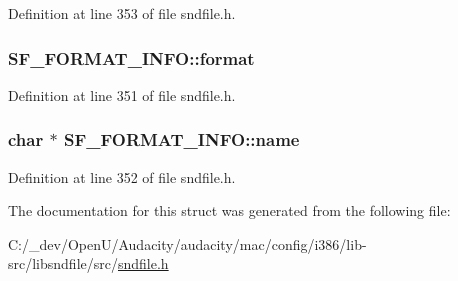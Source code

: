 Definition at line 353 of file sndfile.\+h.

\subsubsection[{\texorpdfstring{format}{format}}]{ S\+F\+\_\+\+F\+O\+R\+M\+A\+T\+\_\+\+I\+N\+F\+O\+::format}\hypertarget{struct_s_f___f_o_r_m_a_t___i_n_f_o_a8d07503c07b5330c298341ca03859f66}{}\label{struct_s_f___f_o_r_m_a_t___i_n_f_o_a8d07503c07b5330c298341ca03859f66}


Definition at line 351 of file sndfile.\+h.

\subsubsection[{\texorpdfstring{name}{name}}]{ char $\ast$ S\+F\+\_\+\+F\+O\+R\+M\+A\+T\+\_\+\+I\+N\+F\+O\+::name}\hypertarget{struct_s_f___f_o_r_m_a_t___i_n_f_o_af9e33bd709af81d99f3d145d86c41273}{}\label{struct_s_f___f_o_r_m_a_t___i_n_f_o_af9e33bd709af81d99f3d145d86c41273}


Definition at line 352 of file sndfile.\+h.



The documentation for this struct was generated from the following file\+:\begin{DoxyCompactItemize}
\item 
C\+:/\+\_\+dev/\+Open\+U/\+Audacity/audacity/mac/config/i386/lib-\/src/libsndfile/src/\hyperlink{mac_2config_2i386_2lib-src_2libsndfile_2src_2sndfile_8h}{sndfile.\+h}\end{DoxyCompactItemize}
